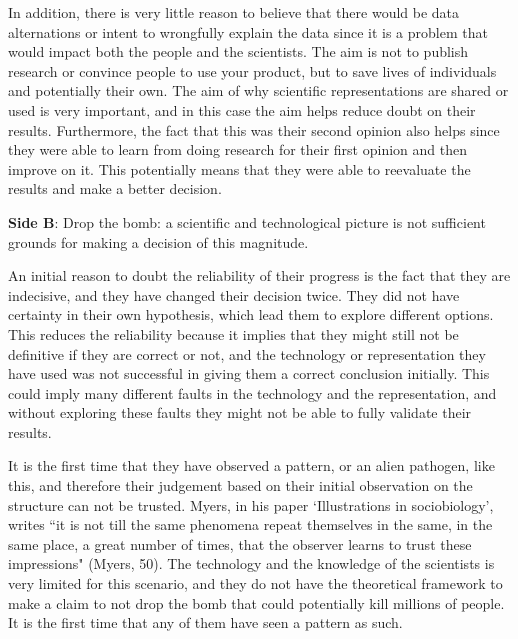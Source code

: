 \documentclass[11pt, oneside]{article}
\begin{document}
\par In addition, there is very little reason to believe that there would be data alternations or intent to wrongfully explain the data since it is a problem that would impact both the people and the scientists. The aim is not to publish research or convince people to use your product, but to save lives of individuals and potentially their own. The aim of why scientific representations are shared or used is very important, and in this case the aim helps reduce doubt on their results. Furthermore, the fact that this was their second opinion also helps since they were able to learn from doing research for their first opinion and then improve on it. This potentially means that they were able to reevaluate the results and make a better decision.


\newpage


\noindent \textbf{Side B}: Drop the bomb: a scientific and technological picture is not sufficient grounds for making a decision of this magnitude.


\par An initial reason to doubt the reliability of their progress is the fact that they are indecisive, and they have changed their decision twice. They did not have certainty in their own hypothesis, which lead them to explore different options. This reduces the reliability because it implies that they might still not be definitive if they are correct or not, and the technology or representation they have used was not successful in giving them a correct conclusion initially. This could imply many different faults in the technology and the representation, and without exploring these faults they might not be able to fully validate their results.


\par It is the first time that they have observed a pattern, or an alien pathogen, like this, and therefore their judgement based on their initial observation on the structure can not be trusted. Myers, in his paper `Illustrations in sociobiology', writes ``it is not till the same phenomena repeat themselves in the same, in the same place, a great number of times, that the observer learns to trust these impressions" (Myers, 50). The technology and the knowledge of the scientists is very limited for this scenario, and they do not have the theoretical framework to make a claim to not drop the bomb that could potentially kill millions of people. It is the first time that any of them have seen a pattern as such.
\end{document}
